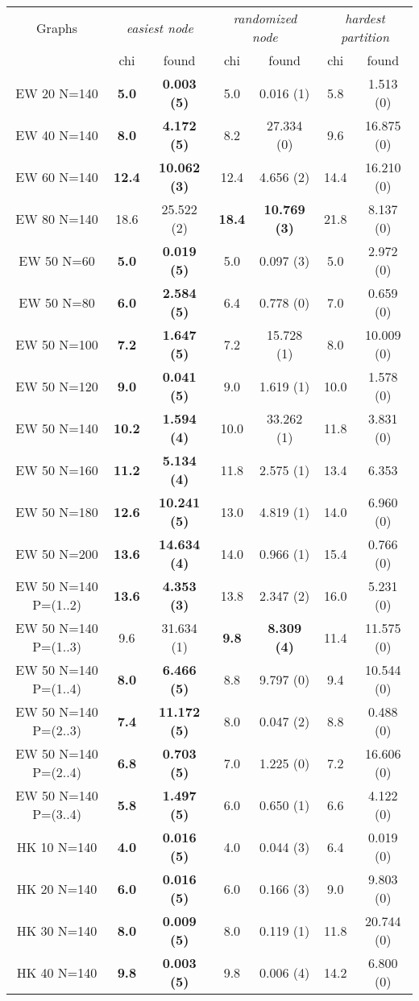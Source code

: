\documentclass[landscape, 12pt]{report}
\begin{document}
\begin{tabular}{|c|cc|cc|cc|}
\hline
\multicolumn{1}{|c|}{Graphs} & \multicolumn{2}{|c|}{\textit{easiest node}} & \multicolumn{2}{|c|}{\textit{randomized node}} & \multicolumn{2}{|c|}{\textit{hardest partition}}
\\
 & chi & found & chi & found & chi & found
\\
\hline
EW 20 N=140 & \textbf{5.0} & \textbf{0.003 (5)} & 5.0 & 0.016 (1) & 5.8 & 1.513 (0)
\\
EW 40 N=140 & \textbf{8.0} & \textbf{4.172 (5)} & 8.2 & 27.334 (0) & 9.6 & 16.875 (0)
\\
EW 60 N=140 & \textbf{12.4} & \textbf{10.062 (3)} & 12.4 & 4.656 (2) & 14.4 & 16.210 (0)
\\
EW 80 N=140 & 18.6 & 25.522 (2) & \textbf{18.4} & \textbf{10.769 (3)} & 21.8 & 8.137 (0)
\\
\hline
EW 50 N=60 & \textbf{5.0} & \textbf{0.019 (5)} & 5.0 & 0.097 (3) & 5.0 & 2.972 (0)
\\
EW 50 N=80 & \textbf{6.0} & \textbf{2.584 (5)} & 6.4 & 0.778 (0) & 7.0 & 0.659 (0)
\\
EW 50 N=100 & \textbf{7.2} & \textbf{1.647 (5)} & 7.2 & 15.728 (1) & 8.0 & 10.009 (0)
\\
EW 50 N=120 & \textbf{9.0} & \textbf{0.041 (5)} & 9.0 & 1.619 (1) & 10.0 & 1.578 (0)
\\
EW 50 N=140 & \textbf{10.2} & \textbf{1.594 (4)} & 10.0 & 33.262 (1) & 11.8 & 3.831 (0)
\\
EW 50 N=160 & \textbf{11.2} & \textbf{5.134 (4)} & 11.8 & 2.575 (1) & 13.4 & 6.353
\\
EW 50 N=180 & \textbf{12.6} & \textbf{10.241 (5)} & 13.0 & 4.819 (1) & 14.0 & 6.960 (0)
\\
EW 50 N=200 & \textbf{13.6} & \textbf{14.634 (4)} & 14.0 & 0.966 (1) & 15.4 & 0.766 (0)
\\
\hline
EW 50 N=140 P=(1..2) & \textbf{13.6} & \textbf{4.353 (3)} & 13.8  & 2.347 (2) & 16.0 & 5.231 (0)
\\
EW 50 N=140 P=(1..3) & 9.6 & 31.634 (1) & \textbf{9.8} & \textbf{8.309 (4)} & 11.4 & 11.575 (0)
\\
EW 50 N=140 P=(1..4) & \textbf{8.0} & \textbf{6.466 (5)} & 8.8 & 9.797 (0) & 9.4 & 10.544 (0)
\\
EW 50 N=140 P=(2..3) & \textbf{7.4} & \textbf{11.172 (5)} & 8.0 & 0.047 (2) & 8.8 & 0.488 (0)
\\
EW 50 N=140 P=(2..4) & \textbf{6.8} & \textbf{0.703 (5)} & 7.0 & 1.225 (0) & 7.2 & 16.606 (0)
\\
EW 50 N=140 P=(3..4) & \textbf{5.8} & \textbf{1.497 (5)} & 6.0 & 0.650 (1) & 6.6 & 4.122 (0)
\\
HK 10 N=140 & \textbf{4.0} & \textbf{0.016 (5)} & 4.0 & 0.044 (3) & 6.4 & 0.019 (0)
\\
HK 20 N=140 & \textbf{6.0} & \textbf{0.016 (5)} & 6.0 & 0.166 (3) & 9.0 & 9.803 (0)
\\
HK 30 N=140 & \textbf{8.0} & \textbf{0.009 (5)} & 8.0 & 0.119 (1) & 11.8 & 20.744 (0)
\\
HK 40 N=140 & \textbf{9.8} & \textbf{0.003 (5)} & 9.8 & 0.006 (4) & 14.2 & 6.800 (0)
\\
\hline 
 \end{tabular}
\end{document}

